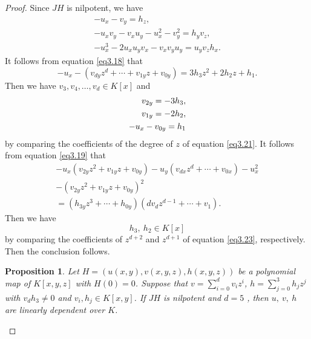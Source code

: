 \documentclass[12pt, twoside, leqno]{article}
\newtheorem{prop}[thm]{Proposition}
\theoremstyle{definition}
\numberwithin{equation}{section}
\begin{document}
\begin{proof}
Since $JH$ is nilpotent, we have
\begin{eqnarray}
-u_{x}-v_{y}=h_{z},\label{eq3.18}\\
-u_{x}v_{y}-v_{x}u_{y}-u_{x}^{2}-v_{y}^{2}=h_{y}v_{z},\label{eq3.19}\\
-u_{x}^{3}-2u_{x}u_{y}v_{x}-v_{x}v_{y}u_{y}=u_{y}v_{z}h_{x}.\label{eq3.20}
\end{eqnarray}
It follows from equation \eqref{eq3.18} that
\begin{equation}\label{eq3.21}
-u_{x}-(v_{dy}z^{d}+\cdots+v_{1y}z+v_{0y})=3h_{3}z^2+2h_{2}z+h_{1}.
\end{equation}
Then we have $v_3,v_{4},\ldots,v_d\in K[x]$ and
\begin{eqnarray}
v_{2y}=-3h_{3},\notag\\
	v_{1y}=-2h_{2},\label{eq3.22}\\
	-u_{x}-v_{0y}=h_{1}\notag
\end{eqnarray}
by comparing the coefficients of the degree of $z$ of equation \eqref{eq3.21}.
It follows from equation \eqref{eq3.19} that
\begin{equation}\label{eq3.23}
\begin{split}
-u_{x}\left(v_{2y}z^{2}+v_{1y}z+v_{0y}\right)-u_{y}\left( v_{dx}z^{d}+\cdots+v_{0x}\right) -u_{x}^{2}\\-\left( v_{2y}z^{2}+v_{1y}z+v_{0y}\right) ^{2}\\=\left( h_{3y}z^{3}+\cdots+h_{0y}\right) \left( dv_{d}z^{d-1}+\cdots+v_{1}\right).
\end{split}
\end{equation}
Then we have
\begin{equation}\label{eq3.24}
h_3,~h_2\in K[x]
\end{equation}
by comparing the coefficients of $z^{d+2}$ and $z^{d+1}$ of equation \eqref{eq3.23}, respectively. Then the conclusion follows.

\begin{prop}\label{prop3.5}
Let $H=(u(x,y),v(x,y,z),h(x,y,z))$ be a polynomial map of $K[x,y,z]$ with $H(0)= 0$. Suppose that  $v=\sum_{i=0}^dv_iz^i$, $h=\sum_{j=0}^3h_jz^j$ with $v_dh_3\neq 0$ and $v_i, h_j\in K[x,y]$. If $JH$ is nilpotent and $d=5$ , then $u,~v,~h$ are linearly dependent over $K$.
\end{prop}


\end{proof}
\end{document}
